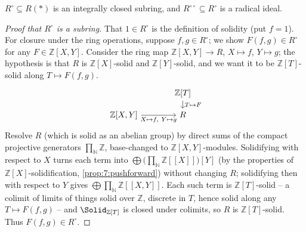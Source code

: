 \begin{lemma}
\label{lem:7:Rzero}
$R^{\circ}\subseteq R(\ast)$ is an integrally closed subring, and
$R^{\circ\circ}\subseteq R^{\circ}$ is a radical ideal.
\end{lemma}

\begin{proof}[Proof that $R^{\circ}$ is a subring]
That $1\in R^{\circ}$ is the definition of solidity (put $f=1$). For closure
under the ring operations, suppose $f,g\in R^{\circ}$; we show $F(f,g)\in
R^{\circ}$ for any $F\in\mathbb{Z}[X,Y]$. Consider the ring map
$\mathbb{Z}[X,Y]\to R$, $X\mapsto f$, $Y\mapsto g$; the hypothesis is that $R$
is $\mathbb{Z}[X]$-solid and $\mathbb{Z}[Y]$-solid, and we want it to be
$\mathbb{Z}[T]$-solid along $T\mapsto F(f,g)$.
\[
\begin{tikzcd}[row sep=small, column sep=large]
& \mathbb{Z}[T] \arrow[d, "T\mapsto F"] \\
\mathbb{Z}[X,Y] \arrow[r, "{X\mapsto f,\ Y\mapsto g}"'] & R
\end{tikzcd}
\]
Resolve $R$ (which is solid as an abelian group) by direct sums of the compact
projective generators $\prod_{\mathbb{N}}\mathbb{Z}$, base-changed to
$\mathbb{Z}[X,Y]$-modules. Solidifying with respect to $X$ turns each term into
$\bigoplus\bigl(\prod_{\mathbb{N}}\mathbb{Z}[\![X]\!]\bigr)[Y]$ (by the
properties of $\mathbb{Z}[X]$-solidification, \cref{prop:7:pushforward}) without
changing $R$; solidifying then with respect to $Y$ gives
$\bigoplus\prod_{\mathbb{N}}\mathbb{Z}[\![X,Y]\!]$. Each such term is
$\mathbb{Z}[T]$-solid -- a colimit of limits of things solid over $\mathbb{Z}$,
discrete in $T$, hence solid along any $T\mapsto F(f,g)$ -- and
$\Solid_{\mathbb{Z}[T]}$ is closed under colimits, so $R$ is
$\mathbb{Z}[T]$-solid. Thus $F(f,g)\in R^{\circ}$.
\end{proof}

